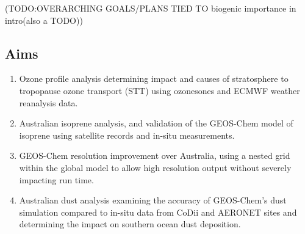 (TODO:OVERARCHING GOALS/PLANS
TIED TO biogenic importance in intro(also a TODO))

\subsection{Aims}
\begin{enumerate}
\item Ozone profile analysis determining impact and causes of stratosphere to tropopause ozone transport (STT) using ozonesones and ECMWF weather reanalysis data.
\item Australian isoprene analysis, and validation of the GEOS-Chem model of isoprene using satellite records and in-situ measurements.
\item GEOS-Chem resolution improvement over Australia, using a nested grid within the global model to allow high resolution output without severely impacting run time.
\item Australian dust analysis examining the accuracy of GEOS-Chem's dust simulation compared to in-situ data from CoDii and AERONET sites and determining the impact on southern ocean dust deposition.
\end{enumerate}